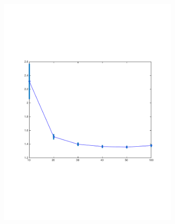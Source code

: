 \begin{figure}[h]
  \centering
  \begin{subfigure}[b]{0.45\textwidth}
   \includegraphics[width=\textwidth]{figures/als_train.pdf}
    \caption{}
  \end{subfigure}
  \begin{subfigure}[b]{0.45\textwidth}

\end{subfigure}
\end{figure}

